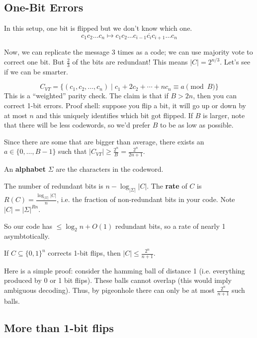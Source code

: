\subsection{One-Bit Errors}

In this setup, one bit is flipped but we don't know which one.
\[ c_1 c_2 \dots c_n \mapsto c_1 c_2 \dots c_{i - 1} \overline{c_i} c_{i + 1} \dots c_n \]

Now, we can replicate the message 3 times as a code; we can use majority vote to correct one bit. But $\frac{2}{3}$ of the bits are redundant!
This means $|C| = 2^{n/3}$.
Let's see if we can be smarter.

\[ C_{VT} = \{ (c_1, c_2, \dots, c_n) \mid c_1 + 2c_2 + \cdots + n c_n \equiv a \pmod B \} \]
This is a ``weighted'' parity check. The claim is that if $B > 2n$, then you can correct 1-bit errors. Proof shell:
suppose you flip a bit, it will go up or down by at most $n$ and this uniquely identifies which bit got flipped. If $B$ is larger, note that there
will be less codewords, so we'd prefer $B$ to be as low as possible.

Since there are some that are bigger than average, there exists an $a \in \{0, \dots, B - 1\}$ such that $|C_{VT}| \geq \frac{2^n}{B} = \frac{2^{n}}{2n + 1}$.

\begin{definition}[Rate]
    An \textbf{alphabet} $\Sigma$ are the characters in the codeword.

    The number of redundant bits is $n - \log_{|\Sigma|} |C|$.
    The \textbf{rate} of $C$ is $R(C) = \frac{\log_{|\Sigma|} |C|}{n}$,
    i.e. the fraction of non-redundant bits in your code.
    Note $|C| = {|\Sigma|}^{Rn}$.
\end{definition}

So our code has $\leq \log_2 n + O(1)$ redundant bits, so a rate of nearly 1 asymbtotically.

\begin{theorem}
    If $C \subseteq \{0, 1\}^n$ corrects 1-bit flips, then $|C| \leq \frac{2^n}{n + 1}$.
\end{theorem}

Here is a simple proof: consider the hamming ball of distance 1 (i.e. everything produced by 0 or 1 bit flips). These balls cannot overlap
(this would imply ambiguous decoding). Thus, by pigeonhole there can only be at most $\frac{2^n}{n + 1}$ such balls.

\subsection{More than 1-bit flips}

